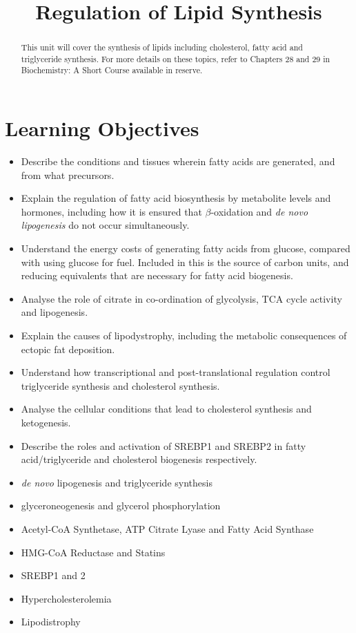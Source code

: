 \documentclass{tufte-handout}
\title{Regulation of Lipid Synthesis}
\author{}
\date{}  %
\begin{document}
\maketitle%

\begin{abstract}
\noindent This unit will cover the synthesis of lipids including cholesterol, fatty acid and triglyceride synthesis.  For more details on these topics, refer to Chapters 28 and 29 in Biochemistry: A Short Course available in reserve\cite{Berg2015}.
\end{abstract}

\tableofcontents

\pagebreak
\section{Learning Objectives}

\begin{itemize}
\item Describe the conditions and tissues wherein fatty acids are generated, and from what precursors.
\item Explain the regulation of fatty acid biosynthesis by metabolite levels and hormones, including how it is ensured that $\beta$-oxidation and \textit{de novo lipogenesis} do not occur simultaneously.
\item Understand the energy costs of generating fatty acids from glucose, compared with using glucose for fuel.  Included in this is the source of carbon units, and reducing equivalents that are necessary for fatty acid biogenesis.
\item Analyse the role of citrate in co-ordination of glycolysis, TCA cycle activity and lipogenesis.
\item Explain the causes of lipodystrophy, including the metabolic consequences of ectopic fat deposition.
\item Understand how transcriptional and post-translational regulation control triglyceride synthesis and cholesterol synthesis.
\item Analyse the cellular conditions that lead to cholesterol synthesis and ketogenesis.
\item Describe the roles and activation of SREBP1 and SREBP2 in fatty acid/triglyceride and cholesterol biogenesis respectively.
\end{itemize}

\begin{itemize}
\item \textit{de novo} lipogenesis and triglyceride synthesis
\item glyceroneogenesis and glycerol phosphorylation
\item Acetyl-CoA Synthetase, ATP Citrate Lyase and Fatty Acid Synthase
\item HMG-CoA Reductase and Statins
\item SREBP1 and 2
\item Hypercholesterolemia
\item Lipodistrophy

\end{itemize}
\end{document}
